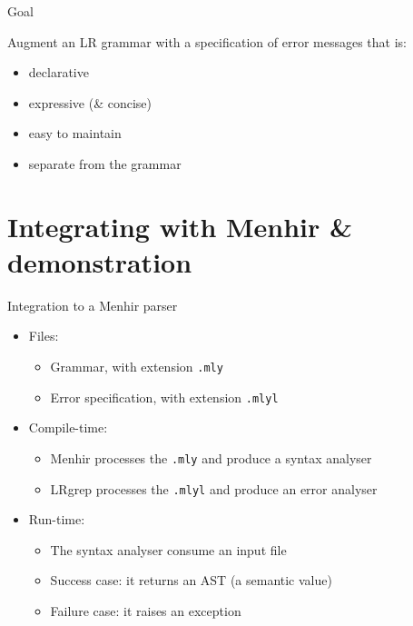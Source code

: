 \documentclass{beamer}          %
\begin{document}
\begin{frame}{Goal}

  Augment an LR grammar with a specification of error messages that is:
  \begin{itemize}
    \item declarative
    \item expressive (\& concise)
    \item easy to maintain
    \item separate from the grammar
  \end{itemize}
\end{frame}

\section{Integrating with Menhir \& demonstration}

\begin{frame}{Integration to a Menhir parser}

  \begin{itemize}
    \item Files:
      \begin{itemize}
      \item Grammar, with extension \texttt{.mly}
      \item<2-> Error specification, with extension \texttt{.mlyl}
      \end{itemize}
    \item Compile-time:
      \begin{itemize}
        \item Menhir processes the \texttt{.mly} and produce a syntax analyser
        \item<2-> LRgrep processes the \texttt{.mlyl} and produce an error analyser
      \end{itemize}
    \item Run-time:
      \begin{itemize}
        \item The syntax analyser consume an input file
        \item Success case: it returns an AST (a semantic value)
        \item Failure case: it raises an exception \\
      \end{itemize}
  \end{itemize}

\end{frame}
\end{document}
